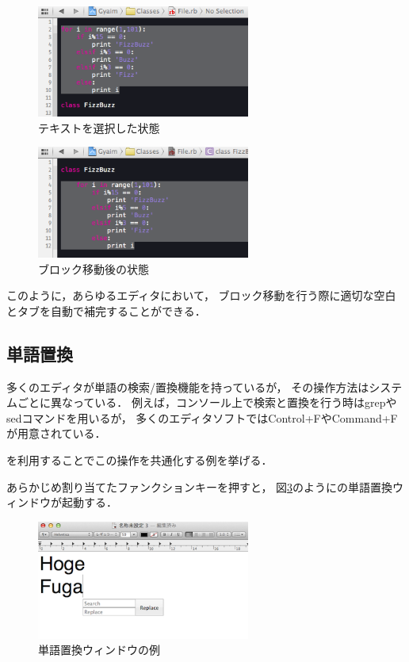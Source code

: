 \begin{figure}[H]
\centerline{\includegraphics[width=70mm,bb=0 0 360 190]{figures/indent2.png}}
\caption{テキストを選択した状態}
\label{indent2}
\end{figure}

\begin{figure}[H]
\centerline{\includegraphics[width=70mm,bb=0 0 360 190]{figures/indent3.png}}
\caption{ブロック移動後の状態}
\label{indent3}
\end{figure}

このように，あらゆるエディタにおいて，
ブロック移動を行う際に適切な空白とタブを自動で補完することができる．

\subsection{単語置換}

多くのエディタが単語の検索/置換機能を持っているが，
その操作方法はシステムごとに異なっている．
例えば，コンソール上で検索と置換を行う時はgrepやsedコマンドを用いるが，
多くのエディタソフトではControl+FやCommand+Fが用意されている．

{\system}を利用することでこの操作を共通化する例を挙げる．

あらかじめ割り当てたファンクションキーを押すと，
図\ref{search1}のように{\system}の単語置換ウィンドウが起動する．

\begin{figure}[H]
\centerline{\includegraphics[width=70mm,bb=0 0 360 215]{figures/replace1.png}}
\caption{単語置換ウィンドウの例}
\label{search1}
\end{figure}

